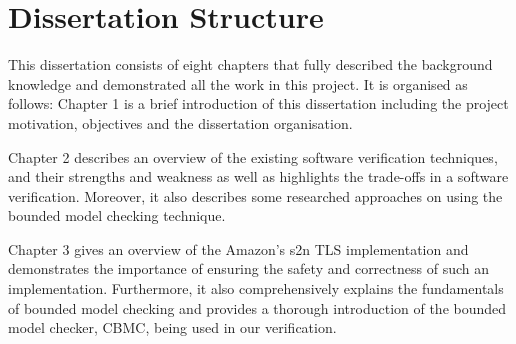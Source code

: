 


\section{Dissertation Structure}
This dissertation consists of eight chapters that fully described the background knowledge and demonstrated all the work in this project. It is organised as follows: 
Chapter 1 is a brief introduction of this dissertation including the project motivation, objectives and the dissertation organisation.

Chapter 2 describes an overview of the existing software verification techniques, and their strengths and weakness as well as highlights the trade-offs in a software verification. Moreover, it also describes some researched approaches on using the bounded model checking technique.

Chapter 3 gives an overview of the Amazon's s2n TLS implementation and demonstrates the importance of ensuring the safety and correctness of such an implementation. Furthermore, it also comprehensively explains the fundamentals of bounded model checking and provides a thorough introduction of the bounded model checker, CBMC, being used in our verification.  


